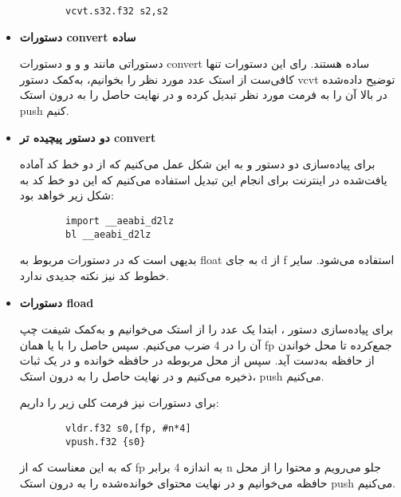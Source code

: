 \begin{itemize}
	\begin{latin}
		\begin{verbatim}
		vcvt.s32.f32 s2,s2 
		\end{verbatim}
	\end{latin}
	
	\item \textbf{
		دستورات convert 
		ساده
	}
	
	دستوراتی مانند
	و
	و 
	و
	دستورات
	convert
	ساده هستند. 
	رای این دستورات تنها کافی‌ست از استک عدد مورد نظر را بخوانیم، به‌کمک دستور vcvt توضیح داده‌شده در بالا آن را به فرمت مورد نظر تبدیل کرده و در نهایت حاصل را به درون استک push کنیم.
	
	
	\item \textbf{
		دو دستور پیچیده تر convert
	}
	
	برای پیاده‌سازی دو دستور
	و
	به این شکل عمل می‌کنیم که از دو خط کد آماده یافت‌شده در اینترنت برای انجام این تبدیل استفاده می‌کنیم که این دو خط کد به شکل زیر خواهد بود:
	
	
	\begin{latin}
		\begin{verbatim}
		import __aeabi_d2lz 
		bl __aeabi_d2lz
		\end{verbatim}
	\end{latin}
	
	بدیهی است که در دستورات مربوط به float به جای d از f استفاده می‌شود. سایر خطوط کد نیز نکته جدیدی ندارد.
	
	\item \textbf{
		دستورات fload
	}
	
	
	برای پیاده‌سازی دستور
	،
	ابتدا یک عدد را از استک می‌خوانیم و به‌کمک شیفت چپ آن را در 4 ضرب می‌کنیم. سپس حاصل را با
	یا همان fp جمع‌کرده تا محل خواندن از حافظه به‌دست آید. سپس از محل مربوطه در حافظه خوانده و در یک ثبات ذخیره می‌کنیم و در نهایت حاصل را به درون استک، push می‌کنیم.
	
	برای دستورات
	نیز فرمت کلی زیر را داریم:
	
	\begin{latin}
		\begin{verbatim}
		vldr.f32 s0,[fp, #n*4] 
		vpush.f32 {s0}
		\end{verbatim}
	\end{latin}
	
	که به این معناست که از fp به اندازه 4 برابر n جلو می‌رویم و محتوا را از محل حافظه می‌خوانیم و در نهایت محتوای خوانده‌شده را به درون استک push می‌کنیم.
	

\end{itemize}
